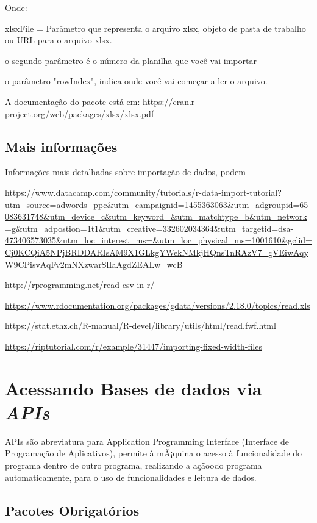 \documentclass[12pt,a4paper,oneside]{erdc}
\begin{document}
Onde:

xlsxFile = Parâmetro que representa o arquivo xlsx, objeto de pasta de trabalho ou URL para o arquivo xlsx.

o segundo parâmetro é o número da planilha que você vai importar

o parâmetro "rowIndex", indica onde você vai começar a ler o arquivo.

A documentação do pacote está em: \url{https://cran.r-project.org/web/packages/xlsx/xlsx.pdf}

\subsection{Mais informações}

Informações mais detalhadas sobre importação de dados, podem

\url{https://www.datacamp.com/community/tutorials/r-data-import-tutorial?utm_source=adwords_ppc&utm_campaignid=1455363063&utm_adgroupid=65083631748&utm_device=c&utm_keyword=&utm_matchtype=b&utm_network=g&utm_adpostion=1t1&utm_creative=332602034364&utm_targetid=dsa-473406573035&utm_loc_interest_ms=&utm_loc_physical_ms=1001610&gclid=Cj0KCQiA5NPjBRDDARIsAM9X1GLkgYWekNMkjHQnsTnRAzV7_gVEiwAqyW9CPisvAqFv2mNXzwarSlIaAgdZEALw_wcB}

\url{http://rprogramming.net/read-csv-in-r/}

\url{https://www.rdocumentation.org/packages/gdata/versions/2.18.0/topics/read.xls}

\url{https://stat.ethz.ch/R-manual/R-devel/library/utils/html/read.fwf.html}

\url{https://riptutorial.com/r/example/31447/importing-fixed-width-files}


\section{Acessando Bases de dados via \textit{APIs}}


APIs são abreviatura para Application Programming Interface (Interface de Programação de Aplicativos), permite à mÃ¡quina o acesso à funcionalidade do programa dentro de outro programa, realizando a açãoodo programa automaticamente, para o uso de funcionalidades e leitura de dados.


\subsection{Pacotes Obrigatórios}
\end{document}
